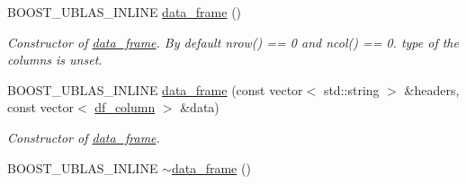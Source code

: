 \begin{DoxyCompactItemize}
\item 
B\+O\+O\+S\+T\+\_\+\+U\+B\+L\+A\+S\+\_\+\+I\+N\+L\+I\+NE \hyperlink{classboost_1_1numeric_1_1ublas_1_1data__frame_a1fe0c252f16d65762717c1da13432e8f}{data\+\_\+frame} ()\hypertarget{classboost_1_1numeric_1_1ublas_1_1data__frame_a1fe0c252f16d65762717c1da13432e8f}{}\label{classboost_1_1numeric_1_1ublas_1_1data__frame_a1fe0c252f16d65762717c1da13432e8f}

\begin{DoxyCompactList}\small\item\em Constructor of \hyperlink{classboost_1_1numeric_1_1ublas_1_1data__frame}{data\+\_\+frame}. By default {\ttfamily nrow()} == 0 and ncol() == 0. type of the columns is unset. \end{DoxyCompactList}\item 
B\+O\+O\+S\+T\+\_\+\+U\+B\+L\+A\+S\+\_\+\+I\+N\+L\+I\+NE \hyperlink{classboost_1_1numeric_1_1ublas_1_1data__frame_a1cfb2a3083283f2aceff85649120ce61}{data\+\_\+frame} (const vector$<$ std\+::string $>$ \&headers, const vector$<$ \hyperlink{classboost_1_1numeric_1_1ublas_1_1df__column}{df\+\_\+column} $>$ \&data)
\begin{DoxyCompactList}\small\item\em Constructor of \hyperlink{classboost_1_1numeric_1_1ublas_1_1data__frame}{data\+\_\+frame}. \end{DoxyCompactList}\item 
B\+O\+O\+S\+T\+\_\+\+U\+B\+L\+A\+S\+\_\+\+I\+N\+L\+I\+NE \hyperlink{classboost_1_1numeric_1_1ublas_1_1data__frame_a5ab7148ee2440c33f10b59c466eba998}{$\sim$data\+\_\+frame} ()\hypertarget{classboost_1_1numeric_1_1ublas_1_1data__frame_a5ab7148ee2440c33f10b59c466eba998}{}\label{classboost_1_1numeric_1_1ublas_1_1data__frame_a5ab7148ee2440c33f10b59c466eba998}


\end{DoxyCompactItemize}

